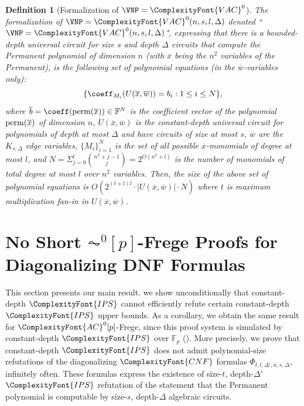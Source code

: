 \documentclass[11pt,letter]{article}
\newtheorem{definition}[theorem]{Definition}
\theoremstyle{remark} %
\newcommand{\perm}{{\rm perm}}
\newcommand{\IPS}{%
    {
        \ComplexityFont{IPS} 
    }
}
\newcommand{\CNF}{ %
    {
        \ComplexityFont{CNF}
    }
}
\newcommand{\F}{\mathbb{F}}
\newcommand{\VAC}{
    {
        \ComplexityFont{VAC}
    }
}
\newcommand{\ACZ}{\ensuremath{\ComplexityFont{AC}^0}}
\begin{document}
{    
    \begin{definition}[Formalization of $\VNP = \VAC^0$]
        \label{def: formalization of VNP = c.d. poly-size} The formalization of $\VNP=\VAC^0(n,s,l,\Delta)$ denoted ``\,$\VNP=\VAC^0(n,s,l,\Delta)$", expressing that there is a bounded-depth universal circuit for size $s$ and depth $\Delta$ circuits that compute the Permanent polynomial of dimension $n$ (with $\overline{x}$ being the $n^2$ variables of the Permanent), is the following set of polynomial equations (in the $\overline{w}$-variables only):
         \[
            \{\coeff_{M_i} (U(\overline{x},\overline{w})) = b_i : 1\leq i \leq N\},
        \]
        where $\overline{b}=\coeff(\perm(\overline{x})) \in \mathbb{F}^N$ is the coefficient vector of the polynomial $\perm(\overline{x})$ of dimension $n$, $U(\overline{x},\overline{w})$ is the constant-depth universal circuit for polynomials of depth at most $\Delta$ and have circuits of size at most $s$, $\overline{w}$ are the $K_{s,\Delta}$ edge variables, $\{M_i\}_{i=1}^N$ is the set of all possible $\overline{x}$-monomials of degree at most $l$, and $N=\Sigma_{j=0}^l \binom{n^2+j-1}{j}=2^{O(n^2+l)}$ is the number of monomials of total degree at most $l$ over $n^2$ variables. Then, the size of the above set of polynomial equations is $O(2^{(t+l)l}\cdot |U(\overline{x},\overline{w})| \cdot N)$ where $t$ is maximum multiplication fan-in in $U(\overline{x},\overline{w})$.\par 
    \end{definition}






\section{No Short $\AC^0[p]$-Frege Proofs for Diagonalizing DNF Formulas}\label{sec:main-theorem-sec}

    This section presents our main result. we show unconditionally that constant-depth $\IPS$ cannot efficiently refute certain constant-depth $\IPS$ upper bounds. As a corollary, we obtain the same result for $\ACZ[p]$-Frege, since this proof system is simulated by constant-depth $\IPS$ over $\F_p$ (). More precisely, we prove that constant-depth $\IPS$ does not admit polynomial-size refutations of the diagonalizing $\CNF$ formulas $\Phi_{t,l,\Delta',n,s,\Delta}$, infinitely often. These formulas express the existence of size-$t$, depth-$\Delta'$ $\IPS$ refutation of the statement that the Permanent polynomial is computable by size-$s$, depth-$\Delta$ algebraic circuits.


}
\end{document}
